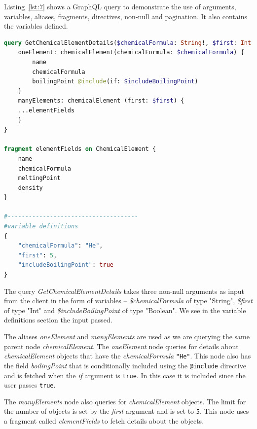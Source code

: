 Listing~\ref{lst:7} shows a GraphQL query to demonstrate the use of arguments, variables, aliases, fragments, directives, non-null and pagination. It also contains the variables defined.

\begin{minipage}{\linewidth}
\begin{lstlisting}[columns=fullflexible, label=lst:7, caption={GraphQL query demonstrating some useful features}, language=GraphQL]
query GetChemicalElementDetails($chemicalFormula: String!, $first: Int!, $includeBoilingPoint: Boolean!) {
	oneElement: chemicalElement(chemicalFormula: $chemicalFormula) {
		name
		chemicalFormula
		boilingPoint @include(if: $includeBoilingPoint) 
	}
	manyElements: chemicalElement (first: $first) {
	...elementFields
	}
}

fragment elementFields on ChemicalElement {
	name
	chemicalFormula
	meltingPoint
	density
}

#-------------------------------------
#variable definitions
{
	"chemicalFormula": "He",
	"first": 5, 
	"includeBoilingPoint": true
}
\end{lstlisting}
\end{minipage}

The query \textit{GetChemicalElementDetails} takes three non-null arguments as input from the client in the form of variables – \textit{\$chemicalFormula} of type "String", \textit{\$first} of type "Int" and \textit{\$includeBoilingPoint} of type "Boolean". We see in the variable definitions section the input passed.

The aliases \textit{oneElement} and \textit{manyElements} are used as we are querying the same parent node \textit{chemicalElement}. The \textit{oneElement} node queries for details about \textit{chemicalElement} objects that have the \textit{chemicalFormula} \texttt{"He"}. This node also has the field \textit{boilingPoint} that is conditionally included using the \texttt{@include} directive and is fetched when the \textit{if} argument is \texttt{true}. In this case it is included since the user passes \texttt{true}. 

The \textit{manyElements} node also queries for \textit{chemicalElement} objects. The limit for the number of objects is set by the \textit{first} argument and is set to \texttt{5}. This node uses a fragment called \textit{elementFields} to fetch details about the objects.


